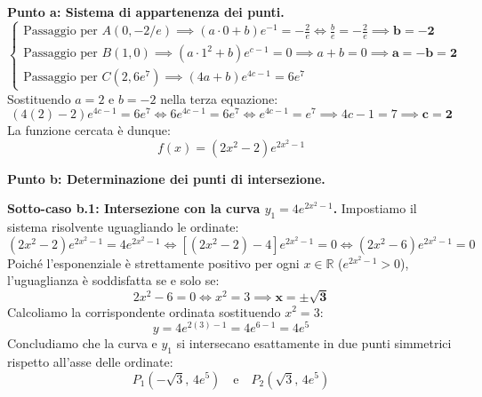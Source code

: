 \documentclass[11pt,a4paper,oneside]{report}
\begin{document}
\begin{dimostrazione}[Svolgimento]
\textbf{Punto a: Sistema di appartenenza dei punti.}
\begin{equation*}
\begin{cases}
    \text{Passaggio per } A(0, -2/e) \implies (a \cdot 0 + b)e^{-1} = -\frac{2}{e} \iff \frac{b}{e} = -\frac{2}{e} \implies \mathbf{b = -2} \\[1.8ex]
    \text{Passaggio per } B(1, 0) \implies (a \cdot 1^2 + b)e^{c-1} = 0 \implies a + b = 0 \implies \mathbf{a = -b = 2} \\[1.8ex]
    \text{Passaggio per } C(2, 6e^7) \implies (4a + b)e^{4c-1} = 6e^7
\end{cases}
\end{equation*}
Sostituendo $a = 2$ e $b = -2$ nella terza equazione:
\begin{equation*}
    (4(2) - 2)e^{4c-1} = 6e^7 \iff 6e^{4c-1} = 6e^7 \iff e^{4c-1} = e^7 \implies 4c - 1 = 7 \implies \mathbf{c = 2}
\end{equation*}
La funzione cercata è dunque:
\begin{equation}
    f(x) = (2x^2 - 2)e^{2x^2 - 1}
\end{equation}

\textbf{Punto b: Determinazione dei punti di intersezione.}

\textbf{Sotto-caso b.1: Intersezione con la curva $y_1 = 4e^{2x^2 - 1}$.}
Impostiamo il sistema risolvente uguagliando le ordinate:
\begin{equation*}
    (2x^2 - 2)e^{2x^2 - 1} = 4e^{2x^2 - 1} \iff [(2x^2 - 2) - 4]e^{2x^2 - 1} = 0 \iff (2x^2 - 6)e^{2x^2 - 1} = 0
\end{equation*}
Poiché l'esponenziale è strettamente positivo per ogni $x \in \mathbb{R}$ ($e^{2x^2 - 1} > 0$), l'uguaglianza è soddisfatta se e solo se:
\begin{equation*}
    2x^2 - 6 = 0 \iff x^2 = 3 \implies \mathbf{x = \pm\sqrt{3}}
\end{equation*}
Calcoliamo la corrispondente ordinata sostituendo $x^2 = 3$:
\begin{equation*}
    y = 4e^{2(3) - 1} = 4e^{6 - 1} = 4e^5
\end{equation*}
Concludiamo che la curva e $y_1$ si intersecano esattamente in due punti simmetrici rispetto all'asse delle ordinate:
\begin{equation}
    P_1(-\sqrt{3}, \, 4e^5) \quad \text{e} \quad P_2(\sqrt{3}, \, 4e^5)
\end{equation}


\end{dimostrazione}
\end{document}
